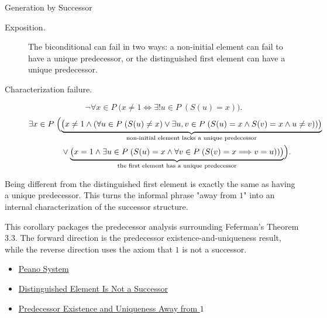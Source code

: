 \begin{topicbox}{Generation by Successor}
\begin{remark*}
\begin{description}
  \item[Exposition.]
  The biconditional can fail in two ways: a non-initial element can fail to
  have a unique predecessor, or the distinguished first element can have a
  unique predecessor.
  \item[Characterization failure.]
  \[
  \neg\forall x \in P\;\bigl(x\neq 1 \Longleftrightarrow
  \exists! u \in P\;(S(u)=x)\bigr).
  \]
  \[
  \begin{aligned}
  &\exists x \in P\;\Bigl(
  \underbrace{\bigl(x\neq 1 \land
  (\forall u \in P\;(S(u)\neq x)
  \lor
  \exists u,v \in P\;(S(u)=x \land S(v)=x \land u\neq v))\bigr)}_
  {\text{non-initial element lacks a unique predecessor}}\\
  &\qquad\qquad\lor
  \underbrace{\bigl(x=1 \land \exists u \in P\;(S(u)=x \land
  \forall v \in P\;(S(v)=x \Longrightarrow v=u))\bigr)}_
  {\text{the first element has a unique predecessor}}
  \Bigr).
  \end{aligned}
  \]
\end{description}
\end{remark*}

\begin{remark*}[Interpretation]
Being different from the distinguished first element is exactly the same as
having a unique predecessor. This turns the informal phrase "away from $1$"
into an internal characterization of the successor structure.
\end{remark*}

\begin{remark*}
This corollary packages the predecessor analysis surrounding Feferman's
Theorem 3.3. The forward direction is the predecessor
existence-and-uniqueness result, while the reverse direction uses the axiom
that $1$ is not a successor. \citet{FefermanNumberSystems1964}
\end{remark*}

\begin{dependencies}
\begin{itemize}
  \item \hyperref[def:peano-system]{Peano System}
  \item \hyperref[ax:peano-base-not-successor]{Distinguished Element Is Not a Successor}
  \item \hyperref[cor:predecessor-exists-unique-away-from-one]{Predecessor Existence and Uniqueness Away from $1$}
\end{itemize}
\end{dependencies}


\end{topicbox}

